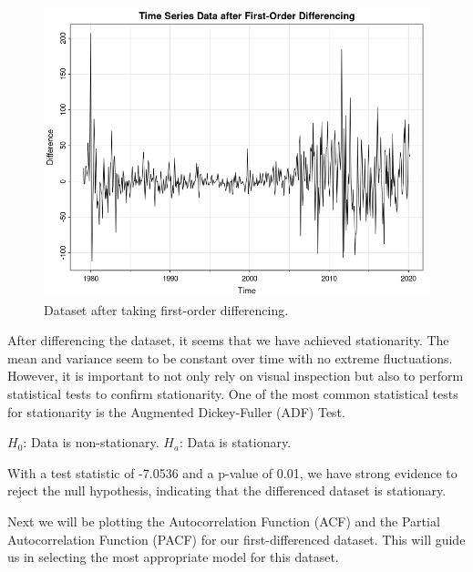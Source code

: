 \documentclass[12pt]{article}
\begin{document}
\begin{figure}[h]
    \centering
    \includegraphics[width=1\textwidth]{images/diff_plot.png}
    \caption{Dataset after taking first-order differencing.}
    \label{fig:figure_2}
\end{figure}

\newpage
After differencing the dataset, it seems that we have achieved stationarity. The mean and variance seem to be constant over time with no extreme fluctuations. However, it is important to not only rely on visual inspection but also to perform statistical tests to confirm stationarity. One of the most common statistical tests for stationarity is the Augmented Dickey-Fuller (ADF) Test. 


$H_0$: Data is non-stationary.
$H_a$: Data is stationary.




With a test statistic of -7.0536 and a p-value of 0.01, we have strong evidence to reject the null hypothesis, indicating that the differenced dataset is stationary.

Next we will be plotting the Autocorrelation Function (ACF) and the Partial Autocorrelation Function (PACF) for our first-differenced dataset. This will guide us in selecting the most appropriate model for this dataset.
\end{document}
